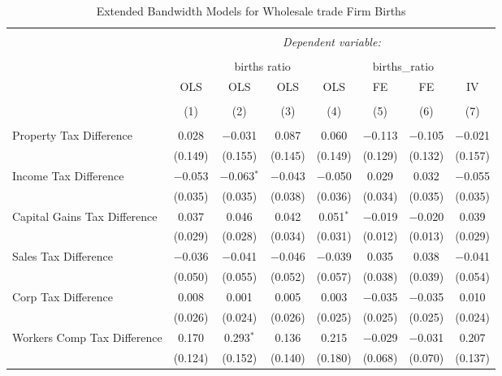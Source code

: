 
\begin{table}[!htbp] \centering 
  \caption{Extended Bandwidth Models for  Wholesale trade Firm Births} 
  \label{} 
\begin{tabular}{@{\extracolsep{5pt}}lccccccc} 
\\[-1.8ex]\hline 
\hline \\[-1.8ex] 
 & \multicolumn{7}{c}{\textit{Dependent variable:}} \\ 
\cline{2-8} 
\\[-1.8ex] & \multicolumn{4}{c}{births ratio} & \multicolumn{2}{c}{births\_ratio} &   \\ 
 & OLS & OLS & OLS & OLS & FE & FE & IV \\ 
\\[-1.8ex] & (1) & (2) & (3) & (4) & (5) & (6) & (7)\\ 
\hline \\[-1.8ex] 
 Property Tax Difference & 0.028 & $-$0.031 & 0.087 & 0.060 & $-$0.113 & $-$0.105 & $-$0.021 \\ 
  & (0.149) & (0.155) & (0.145) & (0.149) & (0.129) & (0.132) & (0.157) \\ 
  Income Tax Difference & $-$0.053 & $-$0.063$^{*}$ & $-$0.043 & $-$0.050 & 0.029 & 0.032 & $-$0.055 \\ 
  & (0.035) & (0.035) & (0.038) & (0.036) & (0.034) & (0.035) & (0.035) \\ 
  Capital Gains Tax Difference & 0.037 & 0.046 & 0.042 & 0.051$^{*}$ & $-$0.019 & $-$0.020 & 0.039 \\ 
  & (0.029) & (0.028) & (0.034) & (0.031) & (0.012) & (0.013) & (0.029) \\ 
  Sales Tax Difference & $-$0.036 & $-$0.041 & $-$0.046 & $-$0.039 & 0.035 & 0.038 & $-$0.041 \\ 
  & (0.050) & (0.055) & (0.052) & (0.057) & (0.038) & (0.039) & (0.054) \\ 
  Corp Tax Difference & 0.008 & 0.001 & 0.005 & 0.003 & $-$0.035 & $-$0.035 & 0.010 \\ 
  & (0.026) & (0.024) & (0.026) & (0.025) & (0.025) & (0.025) & (0.024) \\ 
  Workers Comp Tax Difference & 0.170 & 0.293$^{*}$ & 0.136 & 0.215 & $-$0.029 & $-$0.031 & 0.207 \\ 
  & (0.124) & (0.152) & (0.140) & (0.180) & (0.068) & (0.070) & (0.137) \\ 

\end{tabular}
\end{table}
